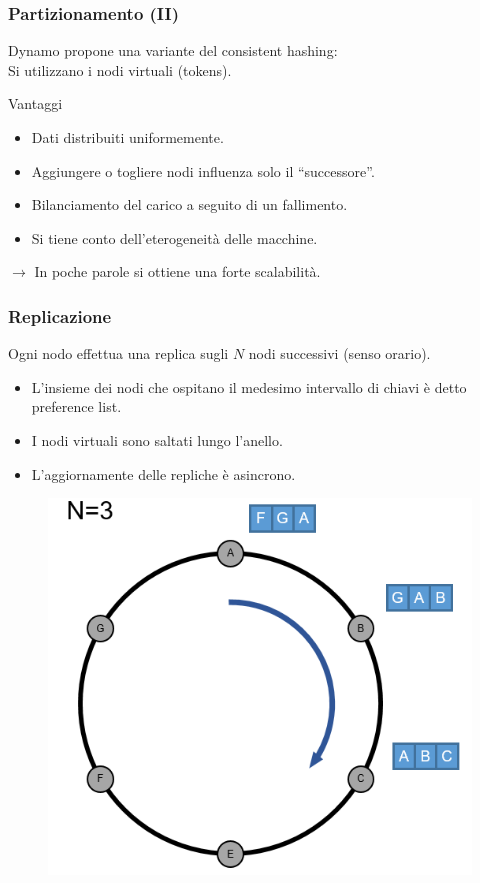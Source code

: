 \begin{frame}
  \frametitle{Partizionamento (II)}
  Dynamo propone una variante del consistent hashing: \\
  Si utilizzano i \alert{nodi virtuali} (tokens).
  \begin{block}{Vantaggi}
  \begin{itemize}
  \item Dati distribuiti uniformemente.
  \item Aggiungere o togliere nodi influenza solo il ``successore''.
  \item Bilanciamento del carico a seguito di un fallimento.
  \item Si tiene conto dell'eterogeneità delle macchine.
  \end{itemize}
  \end{block}
  $\longrightarrow$ In poche parole si ottiene una forte \alert{scalabilità}.
\end{frame}


\begin{frame}
  \frametitle{Replicazione}
  Ogni nodo effettua una replica sugli $N$ nodi successivi (senso orario).
  \begin{itemize}
  \item L'insieme dei nodi che ospitano il medesimo intervallo di chiavi è detto \alert{preference list}.
  \item I nodi virtuali sono saltati lungo l'anello.
  \item L'aggiornamente delle repliche è \alert{asincrono}.
  \end{itemize}
  \begin{figure}
  \centering
  \includegraphics[scale=0.3]{dynamo/replication.png}
  \end{figure}  
\end{frame}


